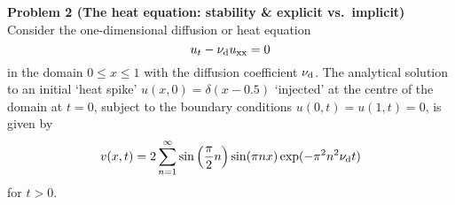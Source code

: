 \documentclass[letter,11pt]{article}
\begin{document}
{\noindent\large\textbf{Problem 2 (The heat equation: stability \& explicit vs.~implicit)}}\\%

\noindent Consider the one-dimensional diffusion or heat equation
\begin{equation}
	u_t -\nu_{\rm d} u_{\rm xx} = 0 \label{eq:heat_eq}
\end{equation}
in the domain $0\le x \le 1$ with the diffusion coefficient $\nu_{\rm d}$. The analytical solution to an initial `heat spike' $u(x,0) = \delta(x-0.5)$ `injected' at the centre of the domain at $t=0$, subject to the boundary conditions $u(0,t)=u(1,t)=0$, is given by
\begin{equation}
	v(x,t) = 2 \sum_{n=1}^{\infty}\sin\left(\frac{\pi}{2}n\right)\sin(\pi n x) \exp(-\pi^2n^2\nu_{\rm d} t) 
\end{equation}
for $t>0$.
\end{document}
